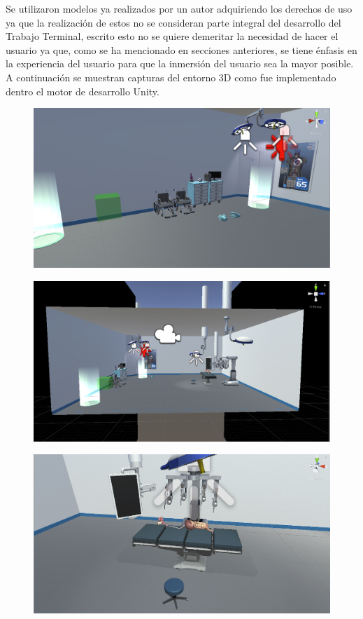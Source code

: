 Se utilizaron modelos ya realizados por un autor adquiriendo los derechos de uso ya que la realización de estos no se consideran parte integral del desarrollo del Trabajo Terminal, escrito esto no se quiere demeritar la necesidad de hacer el usuario ya que, como se ha mencionado en secciones anteriores, se tiene énfasis en la experiencia del usuario para que la inmersión del usuario sea la mayor posible.\\

A continuación se muestran capturas del entorno 3D como fue implementado dentro el motor de desarrollo Unity.\\

\begin{figure}[H]
	\begin{center}
 		\includegraphics[width = .5\textwidth]{source/images/image63.png}
	\end{center} 
\end{figure}

\begin{figure}[H]
	\begin{center}
 		\includegraphics[width = .5\textwidth]{source/images/image53.png}
	\end{center} 
\end{figure}

\begin{figure}[H]
	\begin{center}
 		\includegraphics[width = .5\textwidth]{source/images/image16.png}
	\end{center} 
\end{figure}

